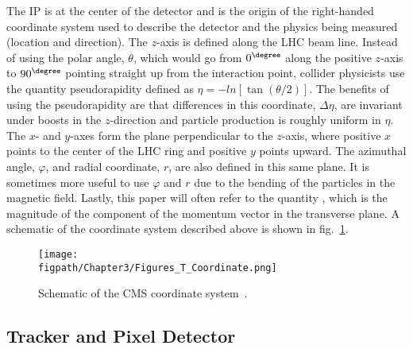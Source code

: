 The IP is at the center of the detector and is the origin of the right-handed coordinate system used to describe the detector and the physics being measured (location and direction).
The $z$-axis is defined along the LHC beam line.
Instead of using the polar angle, $\theta$, which would go from $0^{\degree}$ along the positive $z$-axis to $90^{\degree}$ pointing straight up from the interaction point, collider physicists use the quantity pseudorapidity defined as $\eta=-ln\left[\tan\left(\theta/2\right)\right]$.
The benefits of using the pseudorapidity are that differences in this coordinate, $\Delta\eta$, are invariant under boosts in the $z$-direction and particle production is roughly uniform in $\eta$.
The $x$- and $y$-axes form the plane perpendicular to the $z$-axis, where positive $x$ points to the center of the LHC ring and positive $y$ points upward.
The azimuthal angle, $\varphi$, and radial coordinate, $r$, are also defined in this same plane.
It is sometimes more useful to use $\varphi$ and $r$ due to the bending of the particles in the magnetic field.
Lastly, this paper will often refer to the quantity \pt, which is the magnitude of the component of the momentum vector in the transverse plane.
A schematic of the coordinate system described above is shown in fig.~\ref{fig:CMS_coordinate_system}.

\begin{figure}[!hbt]
    \centering
    \texttt{[image: \\figpath/Chapter3/Figures\_T\_Coordinate.png]}
    \caption{Schematic of the CMS coordinate system~\cite{Schott:2014sea}.}
    \label{fig:CMS_coordinate_system}
\end{figure}

\subsection{Tracker and Pixel Detector}
\label{sec:tracker_and_pixel}

